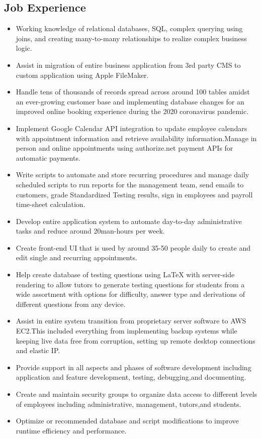 \documentclass[2pt]{resume}
\begin{document}
\subsection{Job Experience}
\begin{itemize}
\item \small Working knowledge of relational databases, SQL, complex querying using joins, and creating many-to-many relationships to realize complex business logic.
\item \small Assist in migration of entire business application from 3rd party CMS to custom application using Apple FileMaker.
\item \small Handle tens of thousands of records spread across around 100 tables amidst an ever-growing customer base and implementing database changes for an improved online booking experience during the 2020 coronavirus pandemic.
\item \small Implement Google Calendar API integration to update employee calendars with appointment information and retrieve availability information.Manage in person and online appointments using authorize.net payment APIs for automatic payments.
\item \small Write scripts to automate and store recurring procedures and manage daily scheduled scripts to run reports for the management team, send emails to customers, grade Standardized Testing results, sign in employees and payroll time-sheet calculation.
\item \small Develop entire application system to automate day-to-day administrative tasks and reduce around 20man-hours per week.
\item \small Create front-end UI that is used by around 35-50 people daily to create and edit single and recurring appointments.
\item \small Help create database of testing questions using LaTeX with server-side rendering to allow tutors to generate testing questions for students from a wide assortment with options for difficulty, answer type and derivations of different questions from any device.
\item \small Assist in entire system transition from proprietary server software to AWS EC2.This included everything from implementing backup systems while keeping live data free from corruption, setting up remote desktop connections and elastic IP.
\item \small Provide support in all aspects and phases of software development including application and feature development, testing, debugging,and documenting.
\item \small Create and maintain security groups to organize data access to different levels of employees including administrative, management, tutors,and students.
\item \small Optimize or recommended database and script modifications to improve runtime efficiency and performance.
\end{itemize}
\end{document}
